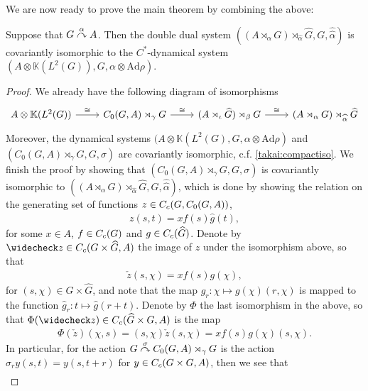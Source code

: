We are now ready to prove the main theorem by combining the above:
\begin{theorem}
Suppose that $G \stackrel{\alpha}{\curvearrowright} A$. Then the double dual system $\left( (A \rtimes_\alpha G) \rtimes_{\hat \alpha} \hat G, G, \hat{\hat{\alpha}} \right)$ is covariantly isomorphic to the $C^*$-dynamical system $(A \otimes \mathbb{K}(L^2(G)), G, \alpha \otimes \mathrm{Ad} \rho)$.	
\label{takai:takai}
\end{theorem}
\begin{proof}
We already have the following diagram of isomorphisms
\begin{equation*}
	\begin{tikzcd}
		A \otimes \mathbb{K}(L^2(G)) \ar[r,"\cong"] & C_0(G,A) \rtimes_{\gamma} G \ar[r, "\cong"] & (A \rtimes_\iota \hat G) \rtimes_\beta G \ar[r, "\cong"] & (A \rtimes_\alpha G) \rtimes_{\hat \alpha} \hat G
	\end{tikzcd}
\end{equation*}
Moreover, the dynamical systems $(A \otimes \mathbb{K}(L^2(G), G, \alpha \otimes \mathrm{Ad} \rho)$ and $(C_0(G,A) \rtimes_{\gamma} G, G, \sigma)$ are covariantly isomorphic, c.f. \cref{takai:compactiso}. We finish the proof by showing that $(C_0(G,A) \rtimes_{\gamma} G, G, \sigma)$ is covariantly isomorphic to $( (A \rtimes_{\alpha} G)\rtimes_{\hat \alpha} \hat G, G, \hat{\hat{\alpha}})$, which is done by showing the relation on the generating set of functions $z \in C_c(G,C_0(G,A))$, 
\begin{align*}
	z(s,t) =x f(s) \hat g(t),
\end{align*}
for some $x \in A$, $f \in C_c(G)$ and $g \in C_c(\widehat{G})$. Denote by $\check z \in \cc(G \times \hat G, A)$ the image of $z$ under the isomorphism above, so that
\begin{align*}
	\check z(s,\chi) = x f(s) g(\chi),
\end{align*}
for $(s,\chi) \in G \times \hat G$, and note that the map $g_r \colon \chi \mapsto g(\chi)(r,\chi)$ is mapped to the function $\hat g_r \colon t \mapsto \hat g(r+t)$. Denote by $\Phi$ the last isomorphism in the above, so that $\Phi(\check z) \in \cc(\hat G\times  G, A)$ is the map
\begin{align*}
	\Phi(\check z)(\chi,s) = (s,\chi) \check z(s,\chi) = x f(s) g(\chi) (s,\chi).
\end{align*}
In particular, for the action $G \stackrel{\sigma}{\curvearrowright} C_0(G,A) \rtimes_{\gamma} G$ is the action $\sigma_r y(s,t) = y(s,t+r)$ for $y \in C_c(G \times G,A)$, then we see that
\begin{align*}

\end{align*}
\end{proof}
